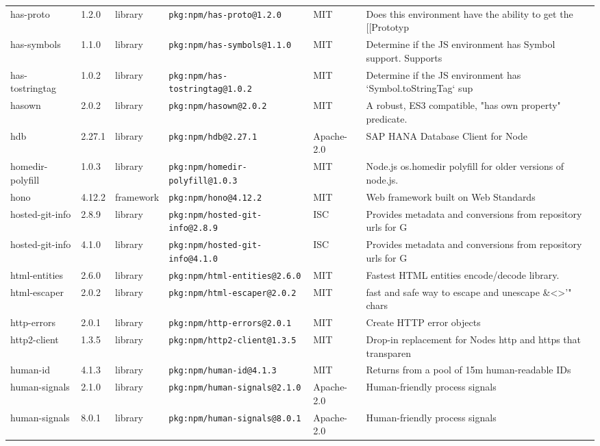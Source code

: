 \documentclass[11pt]{article}
\begin{document}
\begin{longtable}{|l|l|l|p{2.2cm}|l|p{4cm}|}
has-proto & 1.2.0 & library & \texttt{pkg:npm/has-proto@1.2.0} & MIT & Does this environment have the ability to get the [[Prototyp \\
has-symbols & 1.1.0 & library & \texttt{pkg:npm/has-symbols@1.1.0} & MIT & Determine if the JS environment has Symbol support. Supports \\
has-tostringtag & 1.0.2 & library & \texttt{pkg:npm/has-tostringtag@1.0.2} & MIT & Determine if the JS environment has `Symbol.toStringTag` sup \\
hasown & 2.0.2 & library & \texttt{pkg:npm/hasown@2.0.2} & MIT & A robust, ES3 compatible, "has own property" predicate. \\
hdb & 2.27.1 & library & \texttt{pkg:npm/hdb@2.27.1} & Apache-2.0 & SAP HANA Database Client for Node \\
homedir-polyfill & 1.0.3 & library & \texttt{pkg:npm/homedir-polyfill@1.0.3} & MIT & Node.js os.homedir polyfill for older versions of node.js. \\
hono & 4.12.2 & framework & \texttt{pkg:npm/hono@4.12.2} & MIT & Web framework built on Web Standards \\
hosted-git-info & 2.8.9 & library & \texttt{pkg:npm/hosted-git-info@2.8.9} & ISC & Provides metadata and conversions from repository urls for G \\
hosted-git-info & 4.1.0 & library & \texttt{pkg:npm/hosted-git-info@4.1.0} & ISC & Provides metadata and conversions from repository urls for G \\
html-entities & 2.6.0 & library & \texttt{pkg:npm/html-entities@2.6.0} & MIT & Fastest HTML entities encode/decode library. \\
html-escaper & 2.0.2 & library & \texttt{pkg:npm/html-escaper@2.0.2} & MIT & fast and safe way to escape and unescape \&<>'" chars \\
http-errors & 2.0.1 & library & \texttt{pkg:npm/http-errors@2.0.1} & MIT & Create HTTP error objects \\
http2-client & 1.3.5 & library & \texttt{pkg:npm/http2-client@1.3.5} & MIT & Drop-in replacement for Nodes http and https that transparen \\
human-id & 4.1.3 & library & \texttt{pkg:npm/human-id@4.1.3} & MIT & Returns from a pool of 15m human-readable IDs \\
human-signals & 2.1.0 & library & \texttt{pkg:npm/human-signals@2.1.0} & Apache-2.0 & Human-friendly process signals \\
human-signals & 8.0.1 & library & \texttt{pkg:npm/human-signals@8.0.1} & Apache-2.0 & Human-friendly process signals \\

\end{longtable}
\end{document}
